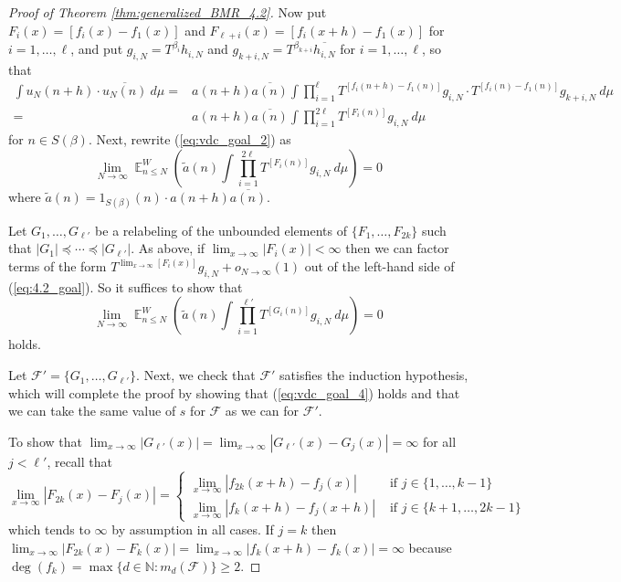 \documentclass[12pt]{article}
\theoremstyle{plain} %
\theoremstyle{definition} %
\theoremstyle{plain}
\theoremstyle{plain}
\numberwithin{equation}{section}
\newcommand{\N}{\mathbb{N}}
\renewcommand{\leq}{\leqslant}
\renewcommand{\geq}{\geqslant}
\newcommand{\1}{\mathbbm{1}}
\newcommand{\E}{\operatorname{\mathbb{E}}}
\newcommand{\oo}{\infty}
\newcommand{\round}[1]{[ #1 ]}
\begin{document}
\begin{proof}[Proof of Theorem \ref{thm:generalized_BMR_4.2}]
Now put $F_i(x)  = \round{f_i(x)-f_1(x)}$ and $F_{\ell+i}(x) = \round{f_i(x+h)-f_1(x)}$ for $i=1,\dots, \ell$, and put $g_{i,N} = T^{\beta_i}h_{i,N}$ and $g_{k+i,N} = T^{\beta_{k+i}}\overline{h_{i,N}}$ for $i=1,\dots, \ell$, so that
\begin{align*}
    \int u_N(n+h)\cdot \overline{u_N(n)} ~d\mu= &a(n+h)\overline{a(n)}\int \prod_{i=1}^{\ell}T^{\round{f_i(n+h)-f_1(n)}}g_{i,N}\cdot T^{\round{f_i(n)-f_1(n)}}{g_{k+i,N}}~d\mu\\
    =&a(n+h)\overline{a(n)}\int \prod_{i=1}^{2\ell}T^{\round{F_{i}(n)}}g_{i,N}~d\mu
\end{align*}
for $n\in S(\beta)$. Next, rewrite (\ref{eq:vdc_goal_2}) as 
\begin{equation}\label{eq:vdc_goal_3}
        \lim_{N\to\oo}\E_{n\leq N}^W\left(\tilde{a}(n) \int \prod_{i=1}^{2\ell}T^{\round{F_{i}(n)}}g_{i,N}~d\mu\right)=0
\end{equation}
where $\tilde{a}(n) = 1_{S(\beta)}(n)\cdot a(n+h)\overline{a(n)}$.


Let $G_1,\dots, G_{\ell'}$ be a relabeling of the unbounded elements of $\{F_1,\dots, F_{2k}\}$ such that $|G_1|\preceq \cdots \preceq |G_{\ell'}|$. As above, if $\lim_{x\to\oo}|F_i(x)|<\oo$ then we can factor terms of the form $T^{\lim_{x\to\oo}[F_i(x)]}g_{i,N}+o_{N\to\oo}(1)$ out of the left-hand side of (\ref{eq:4.2_goal}). So it suffices to show that 
\begin{equation}\label{eq:vdc_goal_4}
        \lim_{N\to\oo}\E_{n\leq N}^W\left(\tilde{a}(n) \int \prod_{i=1}^{\ell'}T^{\round{G_{i}(n)}}g_{i,N}~d\mu\right)=0
\end{equation}
holds.


Let $\mathscr{F}' = \{G_1,\dots, G_{\ell'}\}$. Next, we check that $\mathscr{F}'$ satisfies the induction hypothesis, which will complete the proof by showing that (\ref{eq:vdc_goal_4}) holds and that we can take the same value of $s$ for $\mathscr{F}$ as we can for $\mathscr{F}'$.

To show that $\lim_{x\to\infty}|G_{\ell'}(x)|=\lim_{x\to\infty}|G_{\ell'}(x)-G_j(x)| = \oo$ for all $j<\ell'$, recall that 
$$
\lim_{x\to\infty}|F_{2k}(x)-F_j(x)|  = \begin{cases} 
\lim_{x\to\infty}|f_{2k}(x+h)-f_j(x)| &\text{ if }  j\in \{1,\dots, k-1\}\\
\lim_{x\to\infty}|f_k(x+h)-f_j(x+h)| &\text{ if }  j\in \{k+1,\dots, 2k-1\}
\end{cases}
$$
which tends to $\oo$ by assumption in all cases. If $j=k$ then $\lim_{x\to\infty}|F_{2k}(x)-F_k(x)|  = \lim_{x\to\infty}|f_k(x+h)-f_k(x)|=\oo$ because $\deg(f_k) = \max\{d\in \N: m_d(\mathscr{F})\}\geq 2$.



\end{proof}
\end{document}
